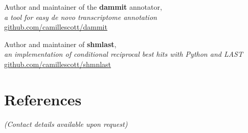 \documentclass[margin,12pt]{camille_resume}
\begin{document}
\begin{resume}
\begin{list1}
\item[] Author and maintainer of the {\bf dammit} annotator,\\
{\em a tool for easy de novo transcriptome annotation}\\
\hfill \href{https://github.com/camillescott/dammit}{github.com/camillescott/dammit}\\

\item[] Author and maintainer of {\bf shmlast},\\
{\em an implementation of conditional reciprocal best hits with Python and LAST}\\
\hfill \href{https://github.com/camillescott/shmlast}{github.com/camillescott/shmnlast}\\

\end{list1}


\section{\mysidestyle References}

{\em (Contact details available upon request)}

\end{resume}
\end{document}
